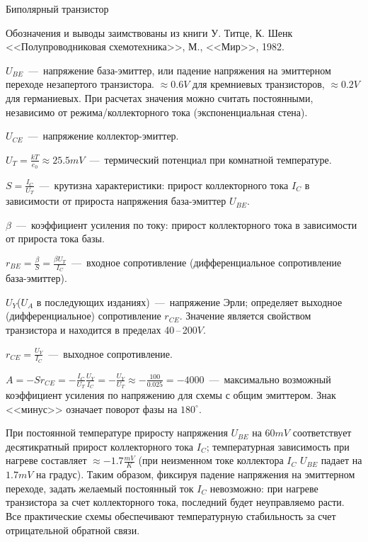 \documentclass[
a4paper
,11pt
,landscape
,russian
,twocolumn
]{letter}
\newcommand\vsp{\vspace{.2in}}
\begin{document}
\thispagestyle{empty}

\begin{Large}
Биполярный транзистор
\end{Large}

Обозначения и выводы заимствованы из книги У. Титце, К. Шенк
<<Полупроводниковая схемотехника>>, М., <<Мир>>, 1982.

$U_{BE}$~---~напряжение база-эмиттер, или падение напряжения на
эмиттерном переходе незапертого транзистора. $\approx 0.6V$ для
кремниевых транзисторов, $\approx 0.2V$ для германиевых. При расчетах
значения можно считать постоянными, независимо от режима/коллекторного
тока (экспоненциальная стена).

$U_{CE}$~---~напряжение коллектор-эмиттер.

$U_T=\frac{kT}{e_0}\approx 25.5mV$~---~термический потенциал при
комнатной температуре.

$S=\frac{I_C}{U_T}$~---~крутизна характеристики: прирост коллекторного
тока $I_C$ в зависимости от прироста напряжения база-эмиттер $U_{BE}$.

$\beta$~---~коэффициент усиления по току: прирост
коллекторного тока в зависимости от прироста тока базы.

$r_{BE}=\frac{\beta}{S}=\frac{\beta U_T}{I_C}$~---~входное сопротивление
(дифференциальное сопротивление база-эмиттер).

$U_Y$($U_A$ в последующих изданиях)~---~напряжение Эрли; определяет
выходное (дифференциальное) сопротивление $r_{CE}$. Значение является
свойством транзистора и находится в пределах 40\,--\,200$V$.

$r_{CE}=\frac{U_Y}{I_C}$~---~выходное сопротивление.

$A=-Sr_{CE}=-\frac{I_C}{U_T}\frac{U_Y}{I_C}=-\frac{U_Y}{U_T}
\approx-\frac{100}{0.025}=-4000$~---~максимально возможный
коэффициент усиления по напряжению для схемы с общим эмиттером.
Знак <<минус>> означает поворот фазы на $180^{\circ}$.

\vsp

При постоянной температуре приросту напряжения $U_{BE}$ на $60mV$
соответствует десятикратный прирост коллекторного тока $I_C$;
температурная зависимость при нагреве составляет
$\approx -1.7\frac{mV}{K}$
(при неизменном токе коллектора $I_C$ $U_{BE}$ падает на
$1.7mV$ на градус). Таким образом, фиксируя падение напряжения на
эмиттерном переходе, задать желаемый постоянный ток $I_C$
невозможно: при нагреве транзистора за счет коллекторного
тока, последний будет неуправляемо расти. Все практические
схемы обеспечивают температурную стабильность за счет
отрицательной обратной связи.
\end{document}
